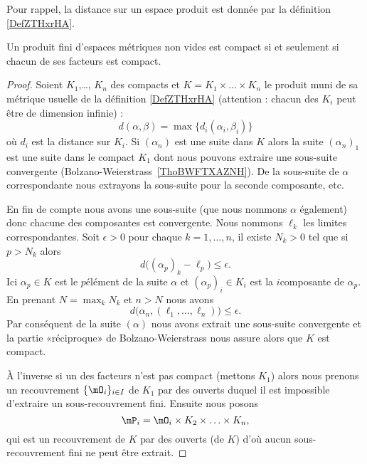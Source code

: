 Pour rappel, la distance sur un espace produit est donnée par la définition \ref{DefZTHxrHA}.
\begin{theorem}\label{THOIYmxXuu}
    Un produit fini d'espaces métriques non vides est compact si et seulement si chacun de ses facteurs est compact.
\end{theorem}

\begin{proof}
    Soient \( K_1\),\ldots, \( K_n\) des compacts et \( K=K_1\times \ldots\times K_n\) le produit muni de sa métrique usuelle de la définition \eqref{DefZTHxrHA} (attention : chacun des \( K_i\) peut être de dimension infinie) :
    \begin{equation}
        d(\alpha,\beta)=\max\{ d_i(\alpha_i,\beta_i) \}
    \end{equation}
    où \( d_i\) est la distance sur \( K_i\). Si \( (\alpha_n)\) est une suite dans \( K\) alors la suite \( (\alpha_n)_1\) est une suite dans le compact \( K_1\) dont nous pouvons extraire une sous-suite convergente (Bolzano-Weierstrass~\ref{ThoBWFTXAZNH}). De la sous-suite de \( \alpha\) correspondante nous extrayons la sous-suite pour la seconde composante, etc.

    En fin de compte nous avons une sous-suite (que nous nommons \( \alpha\) également) donc chacune des composantes est convergente. Nous nommons \( \ell_k\) les limites correspondantes. Soit \( \epsilon>0\) pour chaque \( k=1,\ldots, n\), il existe \( N_k>0\) tel que si \( p>N_k\) alors
    \begin{equation}
        d\big( (\alpha_p)_k-\ell_p \big)\leq \epsilon.
    \end{equation}
    Ici \( \alpha_p\in K\) est le \( p\)\ieme élément de la suite \( \alpha\) et \( (\alpha_p)_i\in K_i\) est la \( i\)\ieme composante de \( \alpha_p\). En prenant \( N=\max_kN_k\) et \( n>N\) nous avons
    \begin{equation}
        d\big( \alpha_n,(\ell_1,\ldots, \ell_n) \big)\leq\epsilon.
    \end{equation}
    Par conséquent de la suite \( (\alpha)\) nous avons extrait une sous-suite convergente et la partie «réciproque» de Bolzano-Weierstrass nous assure alors que \( K\) est compact.

    À l'inverse si un des facteurs n'est pas compact (mettons \( K_1\)) alors nous prenons un recouvrement \( \{ \mO_i \}_{i\in I}\) de \( K_1\) par des ouverts duquel il est impossible d'extraire un sous-recouvrement fini. Ensuite nous posons
    \begin{equation}
        \mP_i=\mO_i\times K_2\times\ldots\times K_n,
    \end{equation}
    qui est un recouvrement de \( K\) par des ouverts (de \( K\)) d'où aucun sous-recouvrement fini ne peut être extrait.
\end{proof}

